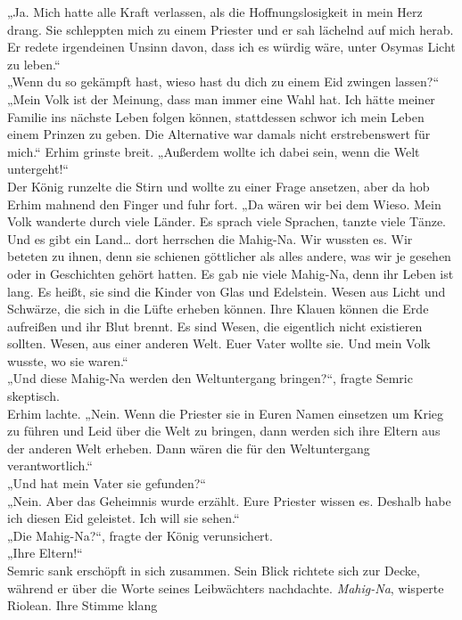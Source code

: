 „Ja. Mich hatte alle Kraft verlassen, als die Hoffnungslosigkeit in mein Herz drang. Sie schleppten 
mich zu einem Priester und er sah lächelnd auf mich herab. Er redete irgendeinen Unsinn davon, dass 
ich es würdig wäre, unter Osymas Licht zu leben.“\\
„Wenn du so gekämpft hast, wieso hast du dich zu einem Eid zwingen lassen?“\\
„Mein Volk ist der Meinung, dass man immer eine Wahl hat. Ich hätte meiner Familie ins nächste Leben 
folgen können, stattdessen schwor ich mein Leben einem Prinzen zu geben. Die Alternative war damals 
nicht erstrebenswert für mich.“ Erhim grinste breit. „Außerdem wollte ich dabei sein, wenn die Welt 
untergeht!“\\
Der König runzelte die Stirn und wollte zu einer Frage ansetzen, aber da hob Erhim mahnend den 
Finger und fuhr fort. „Da wären wir bei dem Wieso. Mein Volk wanderte durch viele Länder. Es sprach 
viele Sprachen, tanzte viele Tänze. Und es gibt ein Land… dort herrschen die Mahig-Na. Wir wussten 
es. Wir beteten zu ihnen, denn sie schienen göttlicher als alles andere, was wir je gesehen oder in 
Geschichten gehört hatten. Es gab nie viele Mahig-Na, denn ihr Leben ist lang. Es heißt, sie sind 
die Kinder von Glas und Edelstein. Wesen aus Licht und Schwärze, die sich in die Lüfte erheben 
können. Ihre Klauen können die Erde aufreißen und ihr Blut brennt. Es sind Wesen, die eigentlich 
nicht existieren sollten. Wesen, aus einer anderen Welt. Euer Vater wollte sie. Und mein Volk 
wusste, wo sie waren.“\\
„Und diese Mahig-Na werden den Weltuntergang bringen?“, fragte Semric skeptisch.\\
Erhim lachte. „Nein. Wenn die Priester sie in Euren Namen einsetzen um Krieg zu führen und Leid über 
die Welt zu bringen, dann werden sich ihre Eltern aus der anderen Welt erheben. Dann wären die für 
den Weltuntergang verantwortlich.“\\
„Und hat mein Vater sie gefunden?“\\
„Nein. Aber das Geheimnis wurde erzählt. Eure Priester wissen es. Deshalb habe ich diesen Eid 
geleistet. Ich will sie sehen.“\\
„Die Mahig-Na?“, fragte der König verunsichert.\\
„Ihre Eltern!“\\
Semric sank erschöpft in sich zusammen. Sein Blick richtete sich zur Decke, während er über die 
Worte seines Leibwächters nachdachte. \textit{Mahig-Na}, wisperte Riolean. Ihre Stimme klang 
